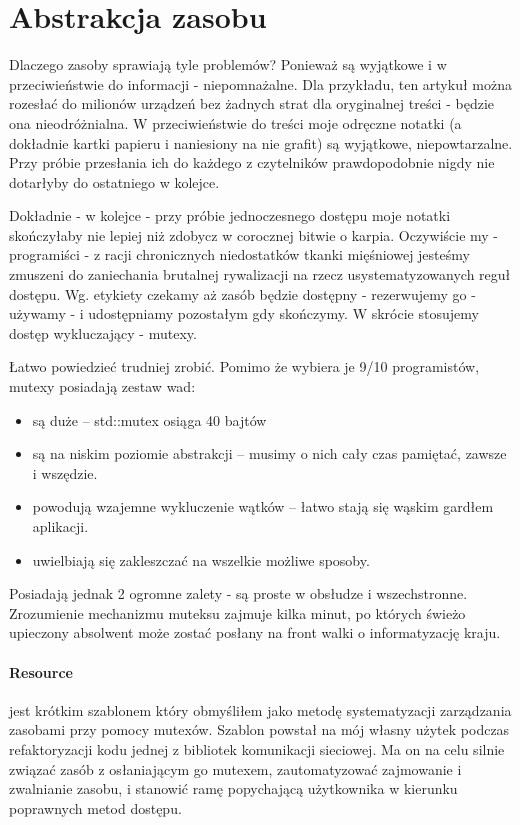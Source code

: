 \section{Abstrakcja zasobu}\label{sec:resource}
Dlaczego zasoby sprawiają tyle problemów? Ponieważ są wyjątkowe i w przeciwieństwie do informacji - niepomnażalne. Dla przykładu, ten artykuł można rozesłać do milionów urządzeń bez żadnych strat dla oryginalnej treści - będzie ona nieodróżnialna. W przeciwieństwie do treści moje odręczne notatki (a dokładnie kartki papieru i naniesiony na nie grafit) są wyjątkowe, niepowtarzalne. Przy próbie przesłania ich do każdego z czytelników prawdopodobnie nigdy nie dotarłyby do ostatniego w kolejce.

Dokładnie - w kolejce - przy próbie jednoczesnego dostępu moje notatki skończyłaby nie lepiej niż zdobycz w corocznej bitwie o karpia. Oczywiście my - programiści - z racji chronicznych niedostatków tkanki mięśniowej jesteśmy zmuszeni do zaniechania brutalnej rywalizacji na rzecz usystematyzowanych reguł dostępu. Wg. etykiety czekamy aż zasób będzie dostępny - rezerwujemy go - używamy - i udostępniamy pozostałym gdy skończymy. W skrócie stosujemy dostęp wykluczający - mutexy.

Łatwo powiedzieć trudniej zrobić. Pomimo że wybiera je 9/10 programistów, mutexy posiadają zestaw wad:
\begin{itemize}
\item są duże -- std::mutex osiąga 40 bajtów
\item są na niskim poziomie abstrakcji -- musimy o nich cały czas pamiętać, zawsze i wszędzie.
\item powodują wzajemne wykluczenie wątków -- łatwo stają się wąskim gardłem aplikacji.
\item uwielbiają się zakleszczać na wszelkie możliwe sposoby.
\end{itemize}
Posiadają jednak 2 ogromne zalety - są proste w obsłudze i wszechstronne. Zrozumienie mechanizmu muteksu zajmuje kilka minut, po których świeżo upieczony absolwent może zostać posłany na front walki o informatyzację kraju.

\paragraph{Resource}
 jest krótkim szablonem który obmyśliłem jako metodę systematyzacji zarządzania zasobami przy pomocy mutexów. Szablon powstał na mój własny użytek podczas refaktoryzacji kodu jednej z bibliotek komunikacji sieciowej. Ma on na celu silnie związać zasób z osłaniającym go mutexem, zautomatyzować zajmowanie i zwalnianie zasobu, i stanowić ramę popychającą użytkownika w kierunku poprawnych metod dostępu.


